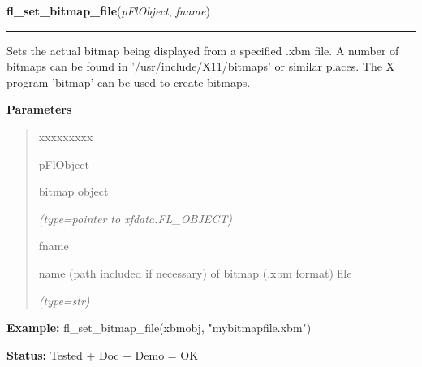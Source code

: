     \label{xformslib:flbitmap:fl_set_bitmap_file}

    \vspace{0.5ex}

\hspace{.8\funcindent}\begin{boxedminipage}{\funcwidth}

    \raggedright \textbf{fl\_set\_bitmap\_file}(\textit{pFlObject}, \textit{fname})

    \vspace{-1.5ex}

    \rule{\textwidth}{0.5\fboxrule}
\setlength{\parskip}{2ex}
    Sets the actual bitmap being displayed from a specified .xbm file. A 
    number of bitmaps can be found in '/usr/include/X11/bitmaps' or similar
    places. The X program 'bitmap' can be used to create bitmaps.

\setlength{\parskip}{1ex}
      \textbf{Parameters}
      \vspace{-1ex}

      \begin{quote}
        \begin{Ventry}{xxxxxxxxx}

          \item[pFlObject]

          bitmap object

            {\it (type=pointer to xfdata.FL\_OBJECT)}

          \item[fname]

          name (path included if necessary) of bitmap (.xbm format) file

            {\it (type=str)}

        \end{Ventry}

      \end{quote}

\textbf{Example:} fl\_set\_bitmap\_file(xbmobj, "mybitmapfile.xbm")



\textbf{Status:} Tested + Doc + Demo = OK



    \end{boxedminipage}

    \label{xformslib:flbitmap:fl_set_bitmap_file}

